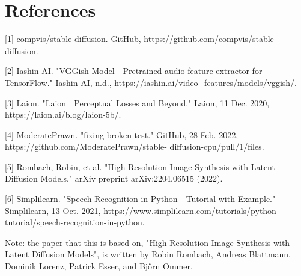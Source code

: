 \documentclass{article}
\begin{document}
\section{References}
\small

[1] compvis/stable-diffusion. GitHub, https://github.com/compvis/stable-diffusion.

[2] Iashin AI. "VGGish Model - Pretrained audio feature extractor for TensorFlow." Iashin AI, n.d., https://iashin.ai/video\_features/models/vggish/.

[3] Laion. "Laion | Perceptual Losses and Beyond." Laion, 11 Dec. 2020, https://laion.ai/blog/laion-5b/.

[4] ModeratePrawn. "fixing broken test." GitHub, 28 Feb. 2022, https://github.com/ModeratePrawn/stable- diffusion-cpu/pull/1/files.

[5] Rombach, Robin, et al. "High-Resolution Image Synthesis with Latent Diffusion Models." arXiv preprint arXiv:2204.06515 (2022).

[6] Simplilearn. "Speech Recognition in Python - Tutorial with Example." Simplilearn, 13 Oct. 2021, https://www.simplilearn.com/tutorials/python-tutorial/speech-recognition-in-python.


Note: the paper that this is based on, "High-Resolution Image Synthesis with Latent Diffusion Models", is written by Robin Rombach, Andreas Blattmann, Dominik Lorenz, Patrick Esser, and Bj\H{o}rn Ommer.
\end{document}
